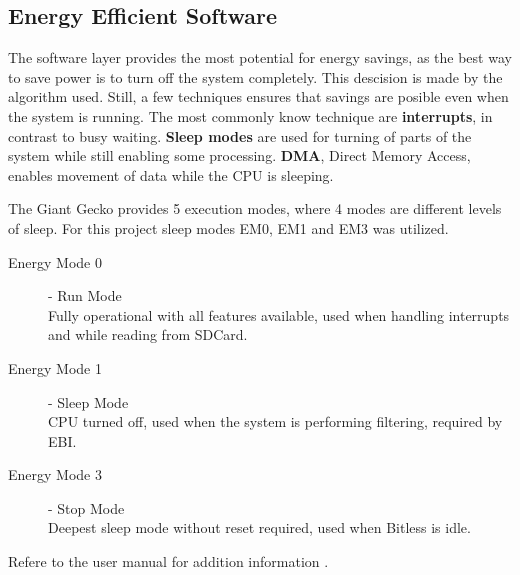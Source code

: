 \subsection{Energy Efficient Software}

The software layer provides the most potential for energy savings, as the best
way to save power is to turn off the system completely. This descision is made
by the algorithm used. Still, a few techniques ensures that savings are posible even when the system 
is running. The most commonly know technique are {\bf interrupts}, in contrast to busy 
waiting. {\bf Sleep modes} are used for turning of parts of the system while still enabling 
some processing. {\bf DMA}, Direct Memory Access, enables movement of data while the
CPU is sleeping. 

The Giant Gecko provides 5 execution modes, where 4 modes are different levels of sleep. 
For this project sleep modes EM0, EM1 and EM3 was utilized.


\begin{description}
	\item[Energy Mode 0] - Run Mode \hfill \\
		Fully operational with all features available, used when handling interrupts and while reading from SDCard.
	\item[Energy Mode 1] - Sleep Mode \hfill \\
		CPU turned off, used when the system is performing filtering, required by EBI.
	\item[Energy Mode 3] - Stop Mode \hfill \\
		Deepest sleep mode without reset required, used when Bitless is idle.
\end{description}
Refere to the user manual for addition information \cite{efm32gg}.

